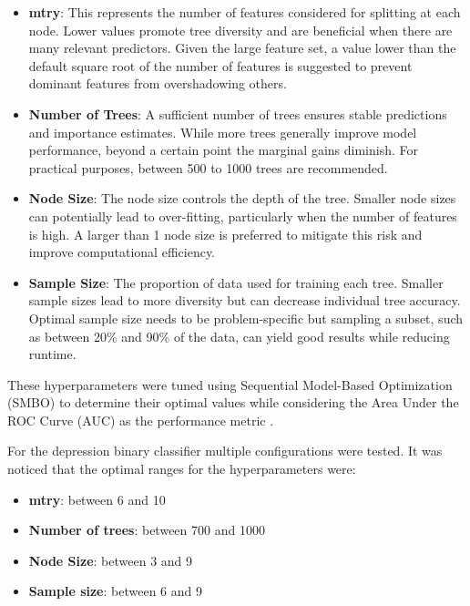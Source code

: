 \documentclass[3p,times,procedia]{elsarticle}
\begin{document}
\begin{itemize}
  \item \textbf{mtry}: This represents the number of features considered for splitting at each node. Lower values promote tree diversity and are beneficial when there are many relevant predictors. Given the large feature set, a value lower than the default square root of the number of features is suggested to prevent dominant features from overshadowing others.
  \item \textbf{Number of Trees}: A sufficient number of trees ensures stable predictions and importance estimates. While more trees generally improve model performance, beyond a certain point the marginal gains diminish. For practical purposes, between 500 to 1000 trees are recommended.
  \item \textbf{Node Size}: The node size controls the depth of the tree. Smaller node sizes can potentially lead to over-fitting, particularly when the number of features is high. A larger than 1 node size is preferred to mitigate this risk and improve computational efficiency.
  \item \textbf{Sample Size}: The proportion of data used for training each tree. Smaller sample sizes lead to more diversity but can decrease individual tree accuracy. Optimal sample size needs to be problem-specific but sampling a subset, such as between 20\% and 90\% of the data, can yield good results while reducing runtime. 
\end{itemize}

These hyperparameters were tuned using Sequential Model-Based Optimization (SMBO) to determine their optimal values while considering the Area Under the ROC Curve (AUC) as the performance metric \cite{probst2019hyperparameters}.

For the depression binary classifier multiple configurations were tested. It was noticed that the optimal ranges for the hyperparameters were:
\begin{itemize}
    \item \textbf{mtry}: between 6 and 10
    \item \textbf{Number of trees}: between 700 and 1000
    \item \textbf{Node Size}: between 3 and 9
    \item \textbf{Sample size}: between 6 and 9
\end{itemize}
\end{document}
